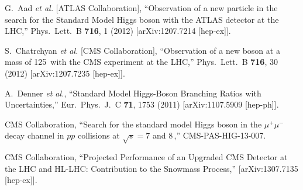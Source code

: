 \documentclass[10pt]{article}
\begin{document}
\begin{thebibliography}{9}


  G.~Aad {\it et al.}  [ATLAS Collaboration],
  ``Observation of a new particle in the search for the Standard Model Higgs boson with the ATLAS detector at the LHC,''
  Phys.\ Lett.\ B {\bf 716}, 1 (2012)
  [arXiv:1207.7214 [hep-ex]].
  
  S.~Chatrchyan {\it et al.}  [CMS Collaboration],
  ``Observation of a new boson at a mass of 125\,\GeV{} with the CMS experiment at the LHC,''
  Phys.\ Lett.\ B {\bf 716}, 30 (2012)
  [arXiv:1207.7235 [hep-ex]].

  A.~Denner {\it et al.},
  ``Standard Model Higgs-Boson Branching Ratios with Uncertainties,''
  Eur.\ Phys.\ J.\ C {\bf 71}, 1753 (2011)
  [arXiv:1107.5909 [hep-ph]].


  CMS Collaboration,
  ``Search for the standard model Higgs boson in the $\mu^+\mu^-$ decay channel 
in $pp$ collisions at $\sqrt{s}= 7$ and 8\,\TeV{},''
  CMS-PAS-HIG-13-007.

  CMS Collaboration,
  ``Projected Performance of an Upgraded CMS Detector at the LHC and HL-LHC: Contribution to the Snowmass Process,''
  [arXiv:1307.7135 [hep-ex]].

\end{thebibliography}

 
\end{document}
